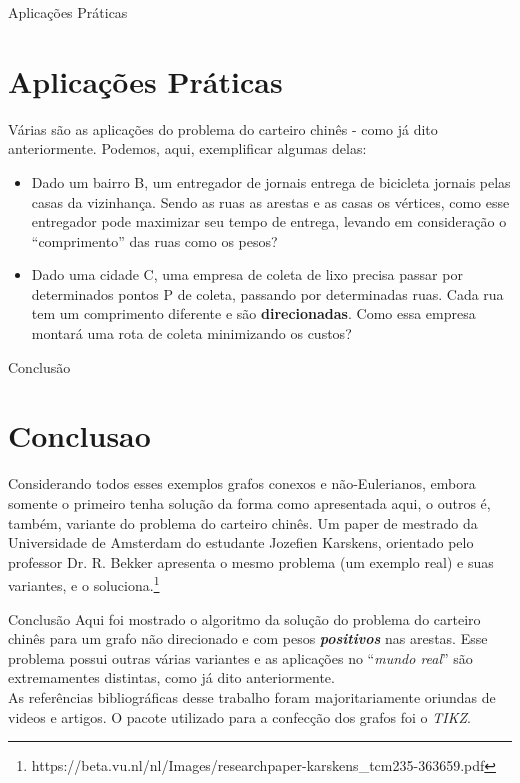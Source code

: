 \documentclass[xcolor=table]{beamer}
\begin{document}
\begin{frame}{Aplicações Práticas}
\section{Aplicações Práticas}

Várias são as aplicações do problema do carteiro chinês - como já dito anteriormente. Podemos, aqui, exemplificar algumas delas:
    \begin{itemize}
        \item Dado um bairro B, um entregador de jornais entrega de bicicleta jornais pelas casas da vizinhança. Sendo as ruas as arestas e as casas os vértices, como esse entregador pode maximizar seu tempo de entrega, levando em consideração o ``comprimento'' das ruas como os pesos?
        \item Dado uma cidade C, uma empresa de coleta de lixo precisa passar por determinados pontos P de coleta, passando por determinadas ruas. Cada rua tem um comprimento diferente e são \textbf{direcionadas}. Como essa empresa montará uma rota de coleta minimizando os custos? 
   \end{itemize}

\end{frame}

\begin{frame}{Conclusão}
\section{Conclusao}
    Considerando todos esses exemplos grafos conexos e não-Eulerianos, embora somente o primeiro tenha solução da forma como apresentada aqui, o outros é, também, variante do problema do carteiro chinês. Um paper de mestrado da Universidade de Amsterdam do estudante Jozefien Karskens, orientado pelo professor Dr. R. Bekker apresenta o mesmo problema (um exemplo real) e suas variantes, e o soluciona.\footnote{https://beta.vu.nl/nl/Images/researchpaper-karskens\_tcm235-363659.pdf}
    
\end{frame}

\begin{frame}{Conclusão}
Aqui foi mostrado o algoritmo da solução do problema do carteiro chinês para um grafo não direcionado e com pesos \textit{\textbf{positivos}} nas arestas. Esse problema possui outras várias variantes e as aplicações no ``\textit{mundo real}'' são extremamentes distintas, como já dito anteriormente.\\
    As referências bibliográficas desse trabalho foram majoritariamente oriundas de videos e artigos. O pacote utilizado para a confecção dos grafos foi o \textit{TIKZ}.
\end{frame}
\end{document}
